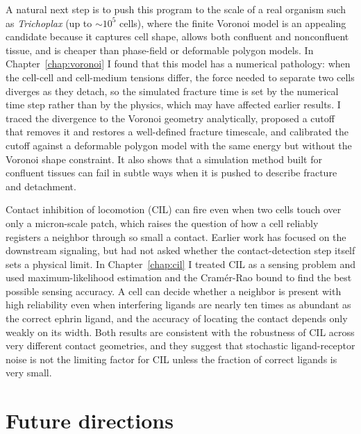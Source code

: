 A natural next step is to push this program to the scale of a real organism such as \textit{Trichoplax} (up to $\sim 10^5$ cells), where the finite Voronoi model is an appealing candidate because it captures cell shape, allows both confluent and nonconfluent tissue, and is cheaper than phase-field or deformable polygon models.
In Chapter~\ref{chap:voronoi} I found that this model has a numerical pathology: when the cell-cell and cell-medium tensions differ, the force needed to separate two cells diverges as they detach, so the simulated fracture time is set by the numerical time step rather than by the physics, which may have affected earlier results.
I traced the divergence to the Voronoi geometry analytically, proposed a cutoff that removes it and restores a well-defined fracture timescale, and calibrated the cutoff against a deformable polygon model with the same energy but without the Voronoi shape constraint.
It also shows that a simulation method built for confluent tissues can fail in subtle ways when it is pushed to describe fracture and detachment.

Contact inhibition of locomotion (CIL) can fire even when two cells touch over only a micron-scale patch, which raises the question of how a cell reliably registers a neighbor through so small a contact.
Earlier work has focused on the downstream signaling, but had not asked whether the contact-detection step itself sets a physical limit.
In Chapter~\ref{chap:cil} I treated CIL as a sensing problem and used maximum-likelihood estimation and the Cram\'er-Rao bound to find the best possible sensing accuracy.
A cell can decide whether a neighbor is present with high reliability even when interfering ligands are nearly ten times as abundant as the correct ephrin ligand, and the accuracy of locating the contact depends only weakly on its width.
Both results are consistent with the robustness of CIL across very different contact geometries, and they suggest that stochastic ligand-receptor noise is not the limiting factor for CIL unless the fraction of correct ligands is very small.


\section{Future directions}
\label{sec:ch6:future}


